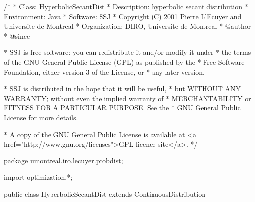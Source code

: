 \begin{code}
\begin{hide}
/*
 * Class:        HyperbolicSecantDist
 * Description:  hyperbolic secant distribution
 * Environment:  Java
 * Software:     SSJ 
 * Copyright (C) 2001  Pierre L'Ecuyer and Universite de Montreal
 * Organization: DIRO, Universite de Montreal
 * @author       
 * @since

 * SSJ is free software: you can redistribute it and/or modify it under
 * the terms of the GNU General Public License (GPL) as published by the
 * Free Software Foundation, either version 3 of the License, or
 * any later version.

 * SSJ is distributed in the hope that it will be useful,
 * but WITHOUT ANY WARRANTY; without even the implied warranty of
 * MERCHANTABILITY or FITNESS FOR A PARTICULAR PURPOSE.  See the
 * GNU General Public License for more details.

 * A copy of the GNU General Public License is available at
   <a href="http://www.gnu.org/licenses">GPL licence site</a>.
 */
\end{hide}
package umontreal.iro.lecuyer.probdist;
\begin{hide}
import optimization.*;
\end{hide}

public class HyperbolicSecantDist extends ContinuousDistribution\begin{hide} {
   protected double mu;
   protected double sigma;
   private static final double ZLIMB = 500.0;
   private static final double ZLIMS = 50.0;

   private static class Optim implements Uncmin_methods
   {
      private int n;
      private double[] xi;

      public Optim (double[] x, int n)
      {
         this.n = n;
         this.xi = new double[n];
         System.arraycopy (x, 0, this.xi, 0, n);
      }

      public double f_to_minimize (double[] p)
      {
         double sum = 0.0;

         if (p[2] <= 0.0)
            return 1e200;

         for (int i = 0; i < n; i++)
            sum -= Math.log (density (p[1], p[2], xi[i]));

         return sum;
      }

      public void gradient (double[] x, double[] g)
      {
      }

      public void hessian (double[] x, double[][] h)
      {
      }
   }
\end{hide}
\end{code}

